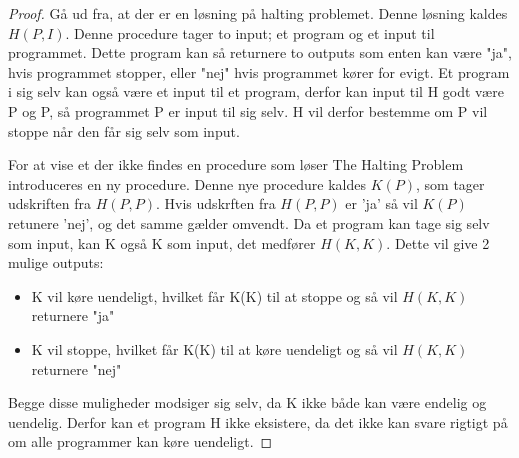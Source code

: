 \begin{proof}
Gå ud fra, at der er en løsning på halting problemet. Denne løsning kaldes $H(P, I)$. Denne procedure tager to input; et program og et input til programmet. Dette program kan så returnere to outputs som enten kan være "ja", hvis programmet stopper, eller "nej" hvis programmet kører for evigt. 
Et program i sig selv kan også være et input til et program, derfor kan input til H godt være P og P, så programmet P er input til sig selv.
H vil derfor bestemme om P vil stoppe når den får sig selv som input.

For at vise et der ikke findes en procedure som løser The Halting Problem introduceres en ny procedure. 
Denne nye procedure kaldes $K(P)$, som tager udskriften fra $H(P,P)$.
Hvis udskrften fra $H(P,P)$ er 'ja' så vil $K(P)$ retunere 'nej', og det samme gælder omvendt.  
Da et program kan tage sig selv som input, kan K også K som input, det medfører $H(K,K)$. 
Dette vil give 2 mulige outputs:
\begin{itemize}
	\item K vil køre uendeligt, hvilket får K(K) til at stoppe og så vil $H(K,K)$ returnere "ja"
	\item  K vil stoppe, hvilket får K(K) til at køre uendeligt og så vil $H(K,K)$ returnere "nej"
\end{itemize}
Begge disse muligheder modsiger sig selv, da K ikke både kan være endelig og uendelig. Derfor kan et program H ikke eksistere, da det ikke kan svare rigtigt på om alle programmer kan køre uendeligt. 

\end{proof}
